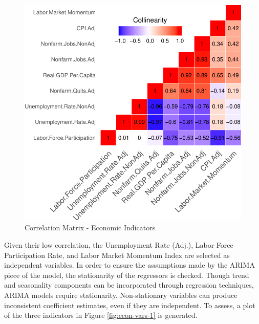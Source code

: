 \documentclass[12pt,letterpaper,toc=flat,oneside]{report}
\theoremstyle{definition}
\theoremstyle{definition}
\theoremstyle{definition}
\theoremstyle{remark}
\begin{document}
\begin{figure}[H]

{\centering \includegraphics{elliott-econometric-personnel-retention-18_files/figure-latex/heat-map-1-1} 

}

\caption{Correlation Matrix - Economic Indicators}\label{fig:heat-map-1}
\end{figure}

Given their low correlation, the Unemployment Rate (Adj.), Labor Force
Participation Rate, and Labor Market Momentum Index are selected as
independent variables. In order to ensure the assumptions made by the
ARIMA piece of the model, the stationarity of the regressors is checked.
Though trend and seasonality components can be incorporated through
regression techniques, ARIMA models require stationarity. Non-stationary
variables can produce inconsistent coefficient estimates, even if they
are independent. To assess, a plot of the three indicators in Figure
\ref{fig:econ-vars-1} is generated.
\end{document}
